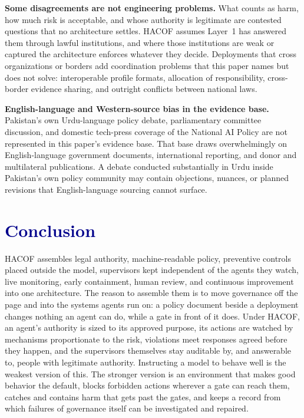 \documentclass[journal]{IEEEtran}
\newcommand{\hacof}{HACOF}
\begin{document}
\textbf{Some disagreements are not engineering problems.} What counts as harm, how much risk is acceptable, and whose authority is legitimate are contested questions that no architecture settles. \hacof{} assumes Layer~1 has answered them through lawful institutions, and where those institutions are weak or captured the architecture enforces whatever they decide. Deployments that cross organizations or borders add coordination problems that this paper names but does not solve: interoperable profile formats, allocation of responsibility, cross-border evidence sharing, and outright conflicts between national laws.

\textbf{English-language and Western-source bias in the evidence base.} Pakistan's own Urdu-language policy debate, parliamentary committee discussion, and domestic tech-press coverage of the National AI Policy are not represented in this paper's evidence base. That base draws overwhelmingly on English-language government documents, international reporting, and donor and multilateral publications. A debate conducted substantially in Urdu inside Pakistan's own policy community may contain objections, nuances, or planned revisions that English-language sourcing cannot surface.

\section{\textcolor{darkblue}{Conclusion}}
\label{sec:conclusion}

\hacof{} assembles legal authority, machine-readable policy, preventive controls placed outside the model, supervisors kept independent of the agents they watch, live monitoring, early containment, human review, and continuous improvement into one architecture. The reason to assemble them is to move governance off the page and into the systems agents run on: a policy document beside a deployment changes nothing an agent can do, while a gate in front of it does. Under \hacof{}, an agent's authority is sized to its approved purpose, its actions are watched by mechanisms proportionate to the risk, violations meet responses agreed before they happen, and the supervisors themselves stay auditable by, and answerable to, people with legitimate authority. Instructing a model to behave well is the weakest version of this. The stronger version is an environment that makes good behavior the default, blocks forbidden actions wherever a gate can reach them, catches and contains harm that gets past the gates, and keeps a record from which failures of governance itself can be investigated and repaired.
\end{document}
